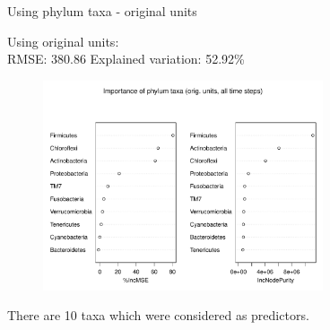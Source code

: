 \documentclass{beamer}
\begin{document}
\begin{frame}{Using phylum taxa - original units}

  {\scriptsize
    
  \noindent Using original units:\\
  RMSE: 380.86  \hspace{0.05in}  Explained variation: 52.92\%

  \begin{center}
    \begin{figure}
      \includegraphics[width=3.25in]{../only_phyla/all_time_steps/orig_units_all_data_phyla_imp_plot}
    \end{figure}
  \end{center}
  \vspace{-0.25in}

\noindent There are 10 taxa which were considered as predictors.
}

\end{frame}
\end{document}

